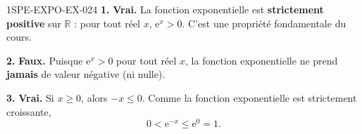 \begin{corrige}{1SPE-EXPO-EX-024}
\textbf{1.} \textbf{Vrai.} La fonction exponentielle est \textbf{strictement positive} sur $\mathbb{R}$ : pour tout réel $x$, $\mathrm{e}^x > 0$. C'est une propriété fondamentale du cours.

\textbf{2.} \textbf{Faux.} Puisque $\mathrm{e}^x > 0$ pour tout réel $x$, la fonction exponentielle ne prend \textbf{jamais} de valeur négative (ni nulle).

\textbf{3.} \textbf{Vrai.} Si $x \geqslant 0$, alors $-x \leqslant 0$. Comme la fonction exponentielle est strictement croissante,
\[0 < \mathrm{e}^{-x} \leqslant \mathrm{e}^{0}=1.\]
\end{corrige}
